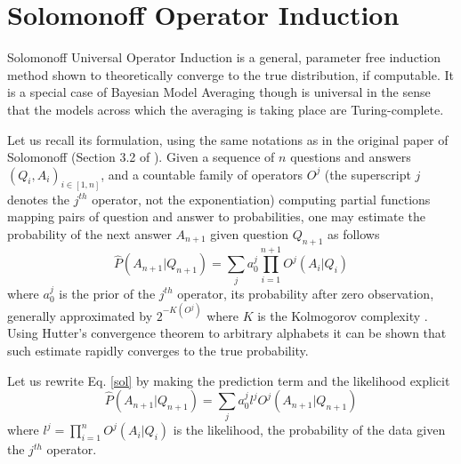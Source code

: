 \documentclass[runningheads]{llncs}
\begin{document}



\section{Solomonoff Operator Induction}
\label{sol-op-ind}
Solomonoff Universal Operator Induction \cite{Solomonoff08Three} is a
general, parameter free induction method shown to theoretically
converge to the true distribution, if computable. It is a special case
of Bayesian Model Averaging \cite{Hoeting99bayesianmodel} though is
universal in the sense that the models across which the averaging is
taking place are Turing-complete.

Let us recall its formulation, using the same notations as in the
original paper of Solomonoff (Section 3.2 of
\cite{Solomonoff08Three}). Given a sequence of $n$ questions and
answers $(Q_i, A_i)_{i \in [1, n]}$, and a countable family of
operators $O^j$ (the superscript $j$ denotes the $j^{th}$ operator,
not the exponentiation) computing partial functions mapping pairs of
question and answer to probabilities, one may estimate the probability
of the next answer $A_{n+1}$ given question $Q_{n+1}$ as follows
\begin{equation}
  \label{sol}
  \hat{P}(A_{n+1}|Q_{n+1}) = \sum_j a_0^j \prod_{i=1}^{n+1} O^j(A_i|Q_i)
\end{equation}
where $a_0^j$ is the prior of the $j^{th}$ operator, its probability
after zero observation, generally approximated by $2^{-K(O^j)}$ where
$K$ is the Kolmogorov complexity \cite{Li97anintroduction}. Using
Hutter's convergence theorem to arbitrary alphabets
\cite{Hutter03Optimality} it can be shown that such estimate rapidly
converges to the true probability.

Let us rewrite Eq. \ref{sol} by making the prediction term and the
likelihood explicit
\begin{equation}
  \label{sol-eas}
\hat{P}(A_{n+1}|Q_{n+1}) = \sum_j a_0^j l^j O^j(A_{n+1}|Q_{n+1})
\end{equation}
where $l^j = \prod_{i=1}^{n} O^j(A_i|Q_i)$ is the likelihood, the
probability of the data given the $j^{th}$ operator.
\end{document}
